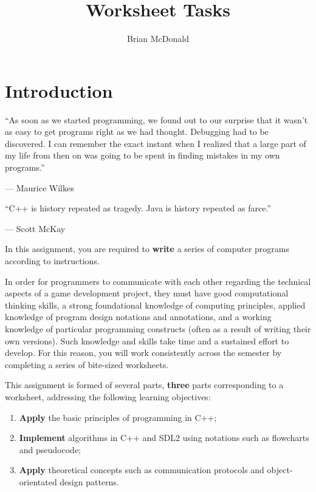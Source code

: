 \documentclass{../../fal_assignment}
\title{Worksheet Tasks}
\author{Brian McDonald}
\begin{document}
	
	\maketitle
	
	\section*{Introduction}
	
	\begin{marginquote}
		``As soon as we started programming, we found out to our surprise that it wasn't as easy to get programs right as we had thought. Debugging had to be discovered. I can remember the exact instant when I realized that a large part of my life from then on was going to be spent in finding mistakes in my own programs.''
		\par --- Maurice Wilkes
		\marginquoterule
		\par ``C++ is history repeated as tragedy. Java is history repeated as farce.''
		\par --- Scott McKay
	\end{marginquote}
	
	In this assignment, you are required to \textbf{write} a series of computer programs according to instructions.
	
	In order for programmers to communicate with each other regarding the technical aspects of a game development project, they must have good computational thinking skills, a strong foundational knowledge of computing principles, applied knowledge of program design notations and annotations, and a working knowledge of particular programming constructs (often as a result of writing their own versions). Such knowledge and skills take time and a sustained effort to develop. For this reason, you will work consistently across the semester by completing a series of bite-sized worksheets.
	
	This assignment is formed of several parts, \textbf{three} parts corresponding to a worksheet, addressing the following learning objectives:
	
	\begin{enumerate}[label=(\Alph*)]
		\item \textbf{Apply} the basic principles of programming in C++;
		\item \textbf{Implement} algorithms in C++ and SDL2 using notations such as flowcharts and pseudocode;
		\item \textbf{Apply} theoretical concepts such as communication protocols and object-orientated design patterns.
	\end{enumerate}
	
\end{document}
